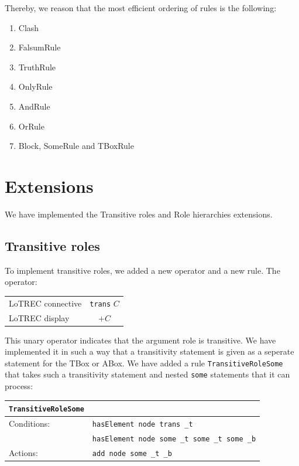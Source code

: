 \documentclass[11pt]{article} %
\begin{document}
Thereby, we reason that the most efficient ordering of rules is the following:

\begin{enumerate}
\item Clash
\item FalsumRule
\item TruthRule
\item OnlyRule
\item AndRule
\item OrRule
\item Block, SomeRule and TBoxRule
\end{enumerate}

\section{Extensions}
\label{sec:extensions}

We have implemented the Transitive roles and Role hierarchies extensions.

\subsection{Transitive roles}

To implement transitive roles, we added a new operator and a new rule. The operator:

\begin{table}[h]
\begin{center}
\begin{tabular}{l c}
LoTREC connective & \texttt{trans} $C$ \\
LoTREC display & $+C$ \\
\end{tabular}
\end{center}
\end{table}

This unary operator indicates that the argument role is transitive. We have implemented it in such a way that a transitivity statement is given as a seperate statement for the TBox or ABox. We have added a rule \texttt{TransitiveRoleSome} that takes such a transitivity statement and nested \texttt{some} statements that it can process:

\begin{table}[h]
\begin{center}
\begin{tabular}{l l}
\texttt{TransitiveRoleSome} & \\
\hline
Conditions: & \texttt{hasElement node trans \_t} \\
 & \texttt{hasElement node some \_t some \_t some \_b} \\
Actions: & \texttt{add node some \_t \_b} \\
\hline
\end{tabular}
\end{center}
\end{table}
\end{document}
